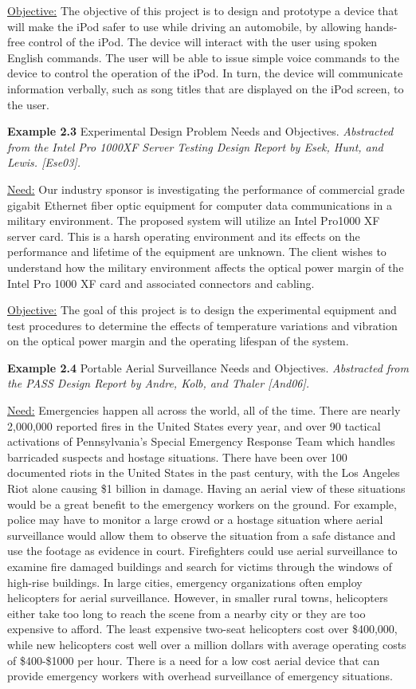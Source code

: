 \ul{Objective:} The objective of this project is to design and prototype
a device that will make the iPod safer to use while driving an
automobile, by allowing hands-free control of the iPod. The device will
interact with the user using spoken English commands. The user will be
able to issue simple voice commands to the device to control the
operation of the iPod. In turn, the device will communicate information
verbally, such as song titles that are displayed on the iPod screen, to
the user.

\textbf{Example 2.3} Experimental Design Problem Needs and Objectives.
\emph{Abstracted from the Intel Pro 1000XF Server Testing Design Report
by Esek, Hunt, and Lewis. {[}Ese03{]}.}

\ul{Need:} Our industry sponsor is investigating the performance of
commercial grade gigabit Ethernet fiber optic equipment for computer
data communications in a military environment. The proposed system will
utilize an Intel Pro1000 XF server card. This is a harsh operating
environment and its effects on the performance and lifetime of the
equipment are unknown. The client wishes to understand how the military
environment affects the optical power margin of the Intel Pro 1000 XF
card and associated connectors and cabling.

\ul{Objective:} The goal of this project is to design the experimental
equipment and test procedures to determine the effects of temperature
variations and vibration on the optical power margin and the operating
lifespan of the system.

\textbf{Example 2.4} Portable Aerial Surveillance Needs and Objectives.
\emph{Abstracted from the PASS Design Report by Andre, Kolb, and Thaler
{[}And06{]}.}

\ul{Need:} Emergencies happen all across the world, all of the time.
There are nearly 2,000,000 reported fires in the United States every
year, and over 90 tactical activations of Pennsylvania's Special
Emergency Response Team which handles barricaded suspects and hostage
situations. There have been over 100 documented riots in the United
States in the past century, with the Los Angeles Riot alone causing \$1
billion in damage. Having an aerial view of these situations would be a
great benefit to the emergency workers on the ground. For example,
police may have to monitor a large crowd or a hostage situation where
aerial surveillance would allow them to observe the situation from a
safe distance and use the footage as evidence in court. Firefighters
could use aerial surveillance to examine fire damaged buildings and
search for victims through the windows of high-rise buildings. In large
cities, emergency organizations often employ helicopters for aerial
surveillance. However, in smaller rural towns, helicopters either take
too long to reach the scene from a nearby city or they are too expensive
to afford. The least expensive two-seat helicopters cost over \$400,000,
while new helicopters cost well over a million dollars with average
operating costs of \$400-\$1000 per hour. There is a need for a low cost
aerial device that can provide emergency workers with overhead
surveillance of emergency situations.

